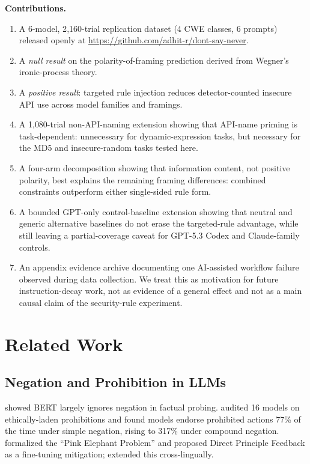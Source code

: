 \documentclass[11pt,a4paper]{article}
\begin{document}
\textbf{Contributions.}

\begin{enumerate}
    \item A 6-model, 2{,}160-trial replication dataset (4 CWE classes, 6 prompts) released openly at \url{https://github.com/adhit-r/dont-say-never}.
    \item A \emph{null result} on the polarity-of-framing prediction derived from Wegner's ironic-process theory.
    \item A \emph{positive result}: targeted rule injection reduces detector-counted insecure API use across model families and framings.
    \item A 1{,}080-trial non-API-naming extension showing that API-name priming is task-dependent: unnecessary for dynamic-expression tasks, but necessary for the MD5 and insecure-random tasks tested here.
    \item A four-arm decomposition showing that information content, not positive polarity, best explains the remaining framing differences: combined constraints outperform either single-sided rule form.
    \item A bounded GPT-only control-baseline extension showing that neutral and generic alternative baselines do not erase the targeted-rule advantage, while still leaving a partial-coverage caveat for GPT-5.3 Codex and Claude-family controls.
    \item An appendix evidence archive documenting one AI-assisted workflow failure observed during data collection. We treat this as motivation for future instruction-decay work, not as evidence of a general effect and not as a main causal claim of the security-rule experiment.
\end{enumerate}

\section{Related Work}

\subsection{Negation and Prohibition in LLMs}

\citet{kassner2020negated} showed BERT largely ignores negation in factual probing. \citet{elkins2026prohibitions} audited 16 models on ethically-laden prohibitions and found models endorse prohibited actions 77\% of the time under simple negation, rising to 317\% under compound negation. \citet{biderman2024pink} formalized the ``Pink Elephant Problem'' and proposed Direct Principle Feedback as a fine-tuning mitigation; \citet{truong2025pink} extended this cross-lingually.
\end{document}
